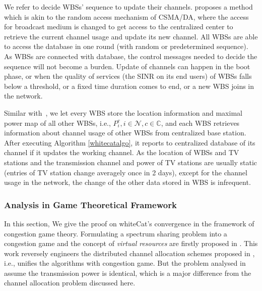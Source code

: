 \documentclass[times]{ettauth}
\newcommand{\ie}{i.e., }
\theoremstyle{mytheoremstyle}
\theoremstyle{mytheoremstyle}
\theoremstyle{mytheoremstyle}
\begin{document}
We refer \cite{CApotentialLearning_05dyspan} to decide WBSs' sequence to update their channels.
\cite{CApotentialLearning_05dyspan} proposes a method which is akin to the random access mechanism of CSMA/DA, where the access for broadcast medium is changed to get access to the centralized center to retrieve the current channel usage and update its new channel. 
All WBSs are able to access the database in one round (with random or predetermined sequence). As WBSs are connected with database, the control messages needed to decide the sequence will not become a burden. 
Update of channels can happen in the boot phase, or when the quality of services (the SINR on its end users) of WBSs falls below a threshold, or a fixed time duration comes to end, or a new WBS joins in the network. 

Similar with~\cite{SenseLess2011}, we let every WBS store the location information and maximal power map of all other WBSs, \ie $P_i^c, i\in\mathcal{N}, c\in\mathbb{C}$, and each WBS retrieves information about channel usage of other WBSs from centralized base station.
After executing Algorithm \ref{whitecatalgo}, it reports to centralized database of its channel if it updates the working channel.
As the location of WBSs and TV stations and the transmission channel and power of TV stations are usually static (entries of TV station change averagely once in 2 days\cite{SenseLess2011}), except for the channel usage in the network, the change of the other data stored in WBS is infrequent. 


\subsubsection{Analysis in Game Theoretical Framework}
\label{game}
In this section, We give the proof on whiteCat's convergence in the framework of congestion game theory.
Formulating a spectrum sharing problem into a congestion game and the concept of \textit{virtual resources} are firstly proposed in \cite{allerton08_liu}.
This work reversely engineers the distributed channel allocation schemes proposed in \cite{babadi_08, Ko_DistributedCA}, \ie unifies the algorithms with congestion game.
But the problem analysed in~\cite{allerton08_liu} assume the transmission power is identical, which is a major difference from the channel allocation problem discussed here. 
\end{document}
